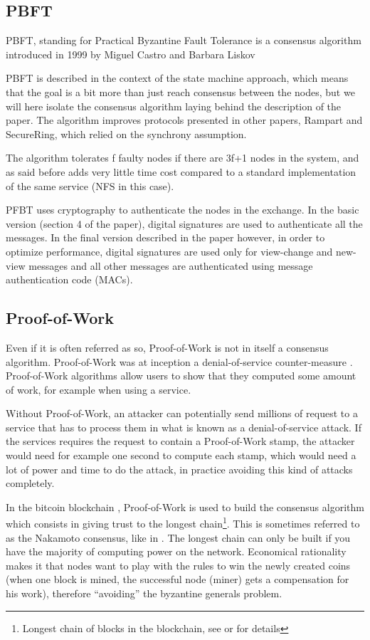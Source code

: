 \documentclass[11pt, twocolumn]{article}
\begin{document}
\subsection{PBFT}

PBFT, standing for Practical Byzantine Fault Tolerance is a consensus algorithm introduced in 1999 by Miguel Castro and Barbara Liskov \cite{pbft}

PBFT is described in the context of the state machine approach, which means that the goal is a bit more than just reach consensus between the nodes, but we will here isolate the consensus algorithm laying behind the description of the paper. The algorithm improves protocols presented in other papers, Rampart and SecureRing, which relied on the synchrony assumption.

The algorithm tolerates f faulty nodes if there are 3f+1 nodes in the system, and as said before adds very little time cost compared to a standard implementation of the same service (NFS in this case).

PFBT uses cryptography to authenticate the nodes in the exchange. In the basic version (section 4 of the paper), digital signatures are used to authenticate all the messages. In the final version described in the paper however, in order to optimize performance, digital signatures are used only for view-change and new-view messages and all other messages are authenticated using message authentication code (MACs).

\subsection{Proof-of-Work}
\label{sec:pow}

Even if it is often referred as so, Proof-of-Work is not in itself a consensus algorithm. Proof-of-Work was at inception a denial-of-service counter-measure \cite{hashcash}. Proof-of-Work algorithms allow users to show that they computed some amount of work, for example when using a service.

Without Proof-of-Work, an attacker can potentially send millions of request to a service that has to process them in what is known as a denial-of-service attack. If the services requires the request to contain a Proof-of-Work stamp, the attacker would need for example one second to compute each stamp, which would need a lot of power and time to do the attack, in practice avoiding this kind of attacks completely.

In the bitcoin blockchain \cite{bitcoin}, Proof-of-Work is used to build the consensus algorithm which consists in giving trust to the longest chain\footnote{Longest chain of blocks in the blockchain, see \cite{blockchain} or \cite{bitcoin} for details}. This is sometimes referred to as the Nakamoto consensus, like in \cite{proconsensus}. The longest chain can only be built if you have the majority of computing power on the network. 
Economical rationality makes it that nodes want to play with the rules to win the newly created coins (when one block is mined, the successful node (miner) gets a compensation for his work), therefore “avoiding” the byzantine generals problem.
\end{document}
